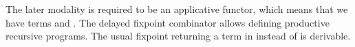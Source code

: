\begin{AgdaAlign}
The later modality is required to be an applicative functor, which means that we have terms  and .
The delayed fixpoint combinator  \cite{BahrGM17} allows defining productive recursive programs. The usual fixpoint returning a term in  instead of   is derivable.
\begin{code}%
%
\>[4]\AgdaSpace{}%
\AgdaSymbol{:}\AgdaSpace{}%
\AgdaSymbol{\{}\AgdaSpace{}%
\AgdaSymbol{:}\AgdaSpace{}%
\AgdaSpace{}%
\AgdaSymbol{\}}\AgdaSpace{}%
\AgdaSymbol{\{}\AgdaSpace{}%
\AgdaSymbol{:}\AgdaSpace{}%
\AgdaSpace{}%
\AgdaSymbol{\}}\AgdaSpace{}%
\AgdaSpace{}%
\AgdaSpace{}%
\AgdaSpace{}%
\AgdaSpace{}%
\AgdaSpace{}%
\AgdaSpace{}%
\AgdaSpace{}%
\AgdaSymbol{(}\AgdaSpace{}%
\AgdaSymbol{)}\<%
\\
%
\>[4]\AgdaSpace{}%
\AgdaSymbol{:}\AgdaSpace{}%
\AgdaSymbol{\{}\AgdaSpace{}%
\AgdaSymbol{:}\AgdaSpace{}%
\AgdaSpace{}%
\AgdaSymbol{\}}\AgdaSpace{}%
\AgdaSymbol{\{}\AgdaSpace{}%
\AgdaSpace{}%
\AgdaSymbol{:}\AgdaSpace{}%
\AgdaSpace{}%
\AgdaSymbol{\}}\AgdaSpace{}%
\AgdaSpace{}%
\AgdaSpace{}%
\AgdaSpace{}%
\AgdaSymbol{(}\AgdaSpace{}%
\AgdaSymbol{(}\AgdaSpace{}%
\AgdaSpace{}%
\AgdaSymbol{))}\AgdaSpace{}%
\AgdaSpace{}%
\AgdaSpace{}%
\AgdaSpace{}%
\AgdaSymbol{(}\AgdaSpace{}%
\AgdaSymbol{)}\AgdaSpace{}%
\AgdaSpace{}%
\AgdaSpace{}%
\AgdaSpace{}%
\AgdaSymbol{(}\AgdaSpace{}%
\AgdaSymbol{)}\<%
\\
%
\>[4]\AgdaSpace{}%
\AgdaSymbol{:}\AgdaSpace{}%
\AgdaSymbol{\{}\AgdaSpace{}%
\AgdaSymbol{:}\AgdaSpace{}%
\AgdaSpace{}%
\AgdaSymbol{\}}\AgdaSpace{}%
\AgdaSymbol{\{}\AgdaSpace{}%
\AgdaSymbol{:}\AgdaSpace{}%
\AgdaSpace{}%
\AgdaSymbol{\}}\AgdaSpace{}%
\AgdaSpace{}%
\AgdaSpace{}%
\AgdaSpace{}%
\AgdaSymbol{(}\AgdaSpace{}%
\AgdaSpace{}%
\AgdaSpace{}%
\AgdaSymbol{)}\AgdaSpace{}%
\AgdaSpace{}%
\AgdaSpace{}%
\AgdaSpace{}%
\AgdaSymbol{(}\AgdaSpace{}%
\AgdaSymbol{)}\<%
\end{code}


\end{AgdaAlign}
